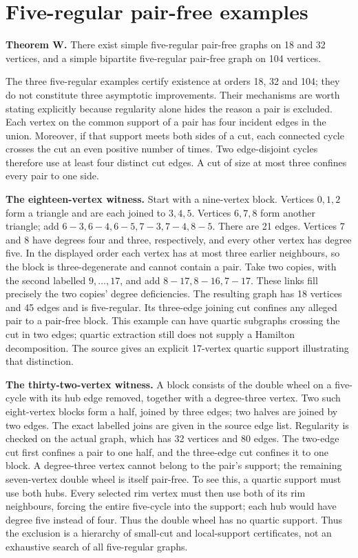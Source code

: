 \documentclass[smallextended]{svjour3}
\begin{document}
\section{Five-regular pair-free
examples}\label{five-regular-pair-free-examples}

\textbf{Theorem W.} There exist simple five-regular pair-free graphs on
18 and 32 vertices, and a simple bipartite five-regular pair-free graph
on 104 vertices.

The three five-regular examples certify existence at orders 18, 32 and
104; they do not constitute three asymptotic improvements. Their
mechanisms are worth stating explicitly because regularity alone hides
the reason a pair is excluded. Each vertex on the common support of a
pair has four incident edges in the union. Moreover, if that support
meets both sides of a cut, each connected cycle crosses the cut an even
positive number of times. Two edge-disjoint cycles therefore use at
least four distinct cut edges. A cut of size at most three confines
every pair to one side.

\textbf{The eighteen-vertex witness.} Start with a nine-vertex block.
Vertices \(0,1,2\) form a triangle and are each joined to \(3,4,5\).
Vertices \(6,7,8\) form another triangle; add
\(6\!-\!3,6\!-\!4,6\!-\!5,7\!-\!3,7\!-\!4,8\!-\!5\). There are 21 edges.
Vertices 7 and 8 have degrees four and three, respectively, and every
other vertex has degree five. In the displayed order each vertex has at
most three earlier neighbours, so the block is three-degenerate and
cannot contain a pair. Take two copies, with the second labelled
\(9,\ldots,17\), and add \(8\!-\!17,8\!-\!16,7\!-\!17\). These links
fill precisely the two copies' degree deficiencies. The resulting graph
has 18 vertices and 45 edges and is five-regular. Its three-edge joining
cut confines any alleged pair to a pair-free block. This example can
have quartic subgraphs crossing the cut in two edges; quartic extraction
still does not supply a Hamilton decomposition. The source gives an
explicit 17-vertex quartic support illustrating that distinction.

\textbf{The thirty-two-vertex witness.} A block consists of the double
wheel on a five-cycle with its hub edge removed, together with a
degree-three vertex. Two such eight-vertex blocks form a half, joined by
three edges; two halves are joined by two edges. The exact labelled
joins are given in the source edge list. Regularity is checked on the
actual graph, which has 32 vertices and 80 edges. The two-edge cut first
confines a pair to one half, and the three-edge cut confines it to one
block. A degree-three vertex cannot belong to the pair's support; the
remaining seven-vertex double wheel is itself pair-free. To see this, a
quartic support must use both hubs. Every selected rim vertex must then
use both of its rim neighbours, forcing the entire five-cycle into the
support; each hub would have degree five instead of four. Thus the
double wheel has no quartic support. Thus the exclusion is a hierarchy
of small-cut and local-support certificates, not an exhaustive search of
all five-regular graphs.
\end{document}
